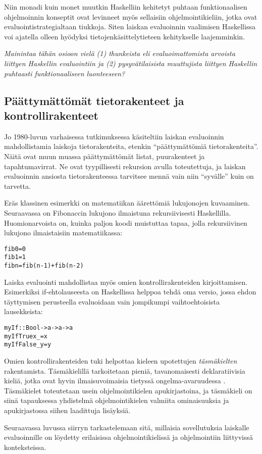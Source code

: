 Niin monadi kuin monet muutkin Haskelliin kehitetyt puhtaan funktionaalisen ohjelmoinnin konseptit ovat levinneet myös sellaisiin ohjelmointikieliin, jotka ovat evaluointistrategialtaan tiukkoja. Siten laiskan evaluoinnin vaalimisen Haskellissa voi ajatella olleen hyödyksi tietojenkäsittelytieteen kehitykselle laajemminkin.

\textit{Mainintaa tähän osioon vielä (1) thunkeista eli evaluoimattomista arvoista liittyen Haskellin evaluointiin ja (2) pysyvätilaisista muuttujista liittyen Haskellin puhtaasti funktionaaliseen luonteeseen? }

\subsection{Päättymättömät tietorakenteet ja kontrollirakenteet}

Jo 1980-luvun varhaisessa tutkimuksessa käsiteltiin laiskan evaluoinnin mahdollistamia laiskoja tietorakenteita, etenkin ``päättymättömiä tietorakenteita''. Näitä ovat muun muassa päättymättömät listat, puurakenteet ja tapahtumavirrat. Ne ovat tyypillisesti rekursion avulla toteutettuja, ja laiskan evaluoinnin ansiosta tietorakenteessa tarvitsee mennä vain niin ``syvälle'' kuin on tarvetta.

\newpage

Eräs klassinen esimerkki on matematiikan äärettömiä lukujonojen kuvaaminen. Seuraavassa on Fibonaccin lukujono ilmaistuna rekursiivisesti Haskellilla. Huomionarvoista on, kuinka paljon koodi muistuttaa tapaa, jolla rekursiivinen lukujono ilmaistaisiin matematiikassa:

\begin{alltt}
fib 0 = 0
fib 1 = 1
fib n = fib (n-1) + fib (n-2)
\end{alltt}

Laiska evaluointi mahdollistaa myös omien kontrollirakenteiden kirjoittamisen. Esimerkiksi if-ehtolauseesta on Haskellissa helppoa tehdä oma versio, jossa ehdon täyttymisen perusteella evaluoidaan vain jompikumpi vaihtoehtoisista lausekkeista:

\begin{alltt}
% Käyttö: myIf condition onTrue onFalse
myIf :: Bool -> a -> a -> a
myIf True  x _ = x
myIf False _ y = y
\end{alltt}

Omien kontrollirakenteiden tuki helpottaa kieleen upotettujen \textit{täsmäkielten} rakentamista. Täsmäkielillä tarkoitetaan pieniä, tavanomaisesti deklaratiivisia kieliä, jotka ovat hyvin ilmaisuvoimaisia tietyssä ongelma-avaruudessa \citep{van2000domain}. Täsmäkielet toteutetaan usein ohjelmointikielen apukirjastoina, ja täsmäkieli on siinä tapauksessa yhdistelmä ohjelmointikielen valmiita ominaisuuksia ja apukirjastossa siihen laadittuja lisäyksiä.

Seuraavassa luvussa siirryn tarkastelemaan sitä, millaisia sovellutuksia laiskalle evaluoinnille on löydetty erilaisissa ohjelmointikielissä ja ohjelmointiin liittyvissä \mbox{konteksteissa.}
